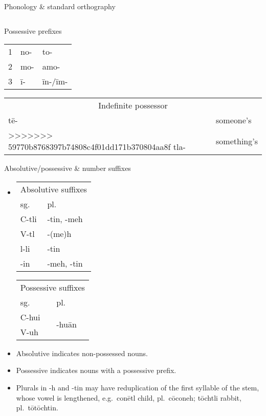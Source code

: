 \documentclass[12pt]{beamer}
\newcommand{\nah}[1]{\textcolor{nahgrn}{#1}}
\newcommand{\trs}[1]{\textcolor{nahblu}{#1}}
\begin{document}
\begin{frame}
\begin{columns}[t]
\begin{column}{.22\linewidth}
\begin{block}{Phonology \& standard orthography}
\begin{threeparttable}
\begin{tablenotes}
\begin{frame}
\begin{columns}[t]
\begin{column}{.23\linewidth}
\begin{block}{Possessive prefixes}
\begin{tabular}[t]{ll}
          1 & \nah{no-} & \nah{to-}              \\
          2 & \nah{mo-} & \nah{amo-}             \\
          3 & \nah{ī-}  & \nah{īn-/īm-}          \\
        \end{tabular}
        \qquad
        \begin{tabular}[t]{ll}
          \multicolumn{2}{c}{Indefinite possessor} \\
          \nah{tē-}  & \trs{someone's}             \\
>>>>>>> 59770b8768397b74808c4f01dd171b370804aa8f
          \nah{tla-} & \trs{something's}
        \end{tabular}
      \end{block}

      \begin{block}{Absolutive/possessive \& number suffixes}
        \begin{itemize}
<<<<<<< HEAD
        \item
          \begin{tabular}[t]{ll}
            \multicolumn{2}{c}{Absolutive suffixes} \\
            sg.   & pl. \\
            \nah{C-tli} & \nah{-tin, -meh} \\
            \nah{V-tl}  & \nah{-(me)h} \\
            \nah{l-li}  & \nah{-tin} \\
            \nah{-in}   & \nah{-meh, -tin} \\
          \end{tabular}%
          \qquad
          \begin{tabular}[t]{ll}
            \multicolumn{2}{c}{Possessive suffixes} \\
            sg.   & pl. \\
            \nah{C-hui} & \multicolumn{1}{l}{\multirow{2}[0]{*}{\nah{-huān}}} \\
            \nah{V-uh}  &  \\
          \end{tabular}%
        \item Absolutive indicates non-possessed nouns.
        \item Possessive indicates nouns with a possessive prefix.
        \item Plurals in \nah{-h} and \nah{-tin} may have reduplication of the first syllable of the stem, whose vowel is lengthened, e.g.~\nah{conētl} \trs{child}, pl.~\nah{cōconeh}; \nah{tōchtli} \trs{rabbit}, pl.~\nah{tōtōchtin}.

\end{itemize}
\end{block}
\end{column}
\end{columns}
\end{frame}
\end{tablenotes}
\end{threeparttable}
\end{block}
\end{column}
\end{columns}
\end{frame}
\end{document}
